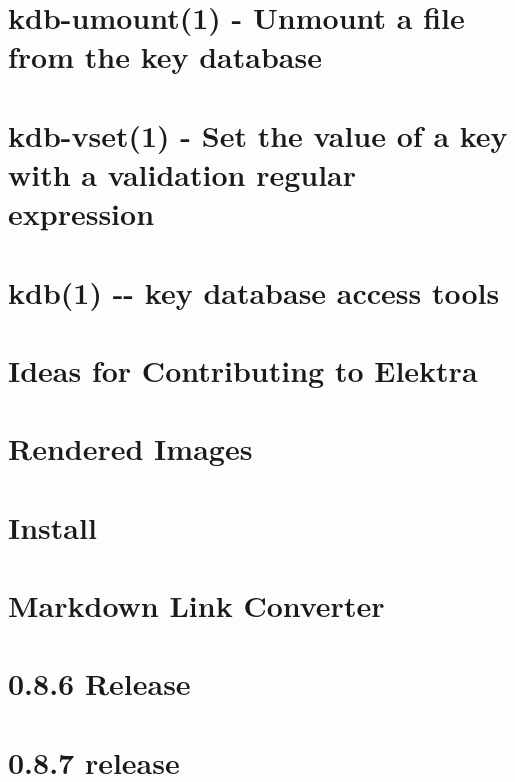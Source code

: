 \documentclass[twoside]{book}
\newcommand{\+}{\discretionary{\mbox{\scriptsize$\hookleftarrow$}}{}{}}
\begin{document}
\chapter{kdb-\/umount(1) -\/ Unmount a file from the key database}
\label{md_doc_help_kdb-umount}

\chapter{kdb-\/vset(1) -\/ Set the value of a key with a validation regular expression}
\label{md_doc_help_kdb-vset}

\chapter{kdb(1) -\/-\/ key database access tools}
\label{md_doc_help_kdb}

\chapter{Ideas for Contributing to Elektra}
\label{doc_IDEAS_md}

\chapter{Rendered Images}
\label{doc_images_README_md}

\chapter{Install}
\label{doc_INSTALL_md}

\chapter{Markdown Link Converter}
\label{doc_markdownlinkconverter_README_md}

\chapter{0.8.6 Release}
\label{doc_news_2014-06-21_0_8_6_md}

\chapter{0.8.7 release}
\label{doc_news_2014-07-28_0_8_7_md}

\end{document}
